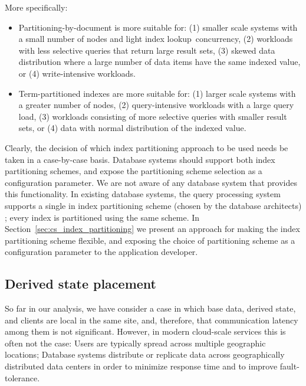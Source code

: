 More specifically:
\begin{itemize}

  \item Partitioning-by-document is more suitable for:
  (1) smaller scale systems with a small number of nodes and light index lookup concurrency,
  (2) workloads with less selective queries that return large result sets,
  (3) skewed data distribution where a large number of data items have the same indexed value,
  or (4) write-intensive workloads.

  \item Term-partitioned indexes are more suitable for:
  (1) larger scale systems with a greater number of nodes,
  (2) query-intensive workloads with a large query load,
  (3) workloads consisting of more selective queries with smaller result sets,
  or (4) data with normal distribution of the indexed value.

\end{itemize}

Clearly, the decision of which index partitioning approach to be used needs be taken in a case-by-case basis.
Database systems should support both index partitioning schemes, and expose the partitioning scheme selection as a
configuration parameter.
We are not aware of any database system that provides this functionality.
In existing database systems,
the query processing system supports a single in index partitioning scheme (chosen by the database architects) \cite{kejriwal:slik, tan:diffindex, riakv:secondaryindexes, cassandra:secondaryindexing};
every index is partitioned using the same scheme.
In Section~\ref{sec:cs_index_partitioning} we present an approach for making the index partitioning scheme flexible,
and exposing the choice of partitioning scheme as a configuration parameter to the application developer.

\subsection{Derived state placement}
\label{sec:topology_patterns}


So far in our analysis,
we have consider a case in which base data, derived state, and clients are local in the same site,
and, therefore, that communication latency among them is not significant.
However, in modern cloud-scale services this is often not the case:
Users are typically spread across multiple geographic locations;
Database systems distribute or replicate data across geographically distributed data centers
in order to minimize response time and to improve fault-tolerance.

